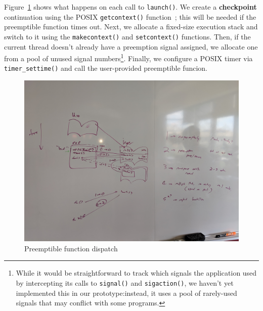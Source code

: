 Figure~\ref{fig:callsimple} shows what happens on each call to \texttt{launch()}.
We create a \textbf{checkpoint} continuation using the POSIX
\texttt{getcontext()} function~\cite{getcontext-manpage}; this will be needed if the
preemptible
function times out.  Next, we allocate a fixed-size execution stack and switch to it
using the \texttt{makecontext()} and \texttt{setcontext()} functions.  Then, if the
current thread doesn't already have a preemption signal assigned, we allocate one
from a pool of unused signal numbers\footnote{While it would be straightforward to
track which signals the application used by intercepting its calls to
\texttt{signal()} and \texttt{sigaction()}, we haven't yet implemented this in our
prototype:\@ instead, it uses a pool of rarely-used signals that may conflict with
some programs.}.  Finally, we configure a POSIX timer via
\texttt{timer\_settime()} and call the user-provided preemptible funcion.

\begin{figure}
\includegraphics[width=\columnwidth]{figs/calltree}
\caption{Preemptible function dispatch}
\label{fig:callsimple}
\end{figure}

